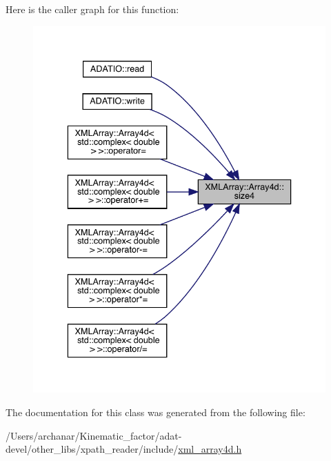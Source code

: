 Here is the caller graph for this function\+:
\nopagebreak
\begin{figure}[H]
\begin{center}
\leavevmode
\includegraphics[width=336pt]{de/d16/classXMLArray_1_1Array4d_abcaa3187b7b1b4b36997937c7597f393_icgraph}
\end{center}
\end{figure}


The documentation for this class was generated from the following file\+:\begin{DoxyCompactItemize}
\item 
/\+Users/archanar/\+Kinematic\+\_\+factor/adat-\/devel/other\+\_\+libs/xpath\+\_\+reader/include/\mbox{\hyperlink{adat-devel_2other__libs_2xpath__reader_2include_2xml__array4d_8h}{xml\+\_\+array4d.\+h}}\end{DoxyCompactItemize}
